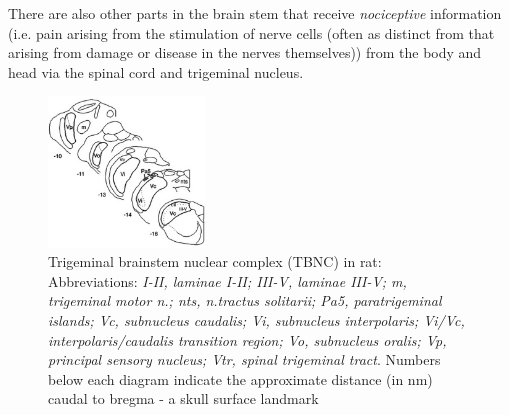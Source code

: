 \begin{mdframed}

There are also other parts in the brain stem that receive {\it nociceptive}
information (i.e. pain arising from the stimulation of nerve cells (often as
distinct from that arising from damage or disease in the nerves themselves))
from the body and head via the spinal cord and trigeminal nucleus.

\end{mdframed}

\begin{figure}[hbt]
  \centerline{
  \includegraphics[height=4cm,
    angle=0]{./images/TBNC.eps}}
\caption{Trigeminal brainstem nuclear complex (TBNC) in rat:
Abbreviations:  {\it I-II, laminae I-II; III-V, laminae III-V; m, trigeminal
motor n.; nts, n.tractus solitarii; Pa5, paratrigeminal islands; Vc, subnucleus
caudalis; Vi, subnucleus interpolaris; Vi/Vc, interpolaris/caudalis transition
region; Vo, subnucleus oralis; Vp, principal sensory nucleus; Vtr, spinal trigeminal tract}.
Numbers below each diagram indicate the approximate distance (in nm) caudal to
bregma - a skull surface landmark}
\label{fig:TBNC}
\end{figure}

